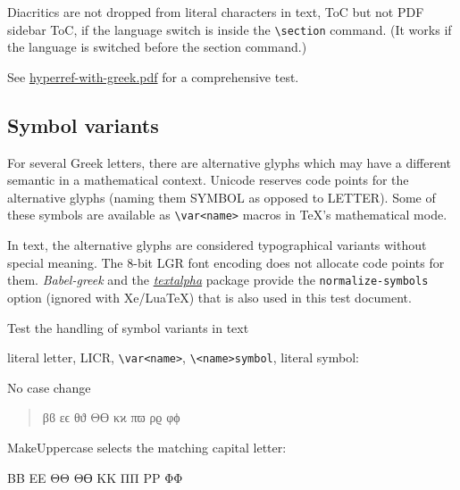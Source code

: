 \documentclass[a4paper]{article}
\newcommand*{\ux}[2]{\ignorespaces#1}
\newcommand*{\ux}[2]{\ignorespaces#2}
\newcommand*{\Greek}{\foreignlanguage{greek}}
\newcommand*{\Greek}{\ensuregreek}
\newcommand{\cs}[1]{\texttt{\textbackslash#1}}
\begin{document}
\ux{}{Transliteration input stays Latin in PDF strings.}

Diacritics are not dropped from literal characters in text, ToC but not
PDF sidebar ToC, if the language switch is inside the \cs{section} command.
(It works if the language is switched before the section command.)

See \href{hyperref-with-greek.pdf}{hyperref-with-greek.pdf} for a
comprehensive test.


\subsection{Symbol variants}

For several Greek letters, there are alternative glyphs which may
have a different semantic in a mathe­matical context.
Unicode reserves code points for the alternative glyphs
(naming them SYMBOL as opposed to LETTER).
Some of these symbols are available as \cs{var<name>} macros in TeX's
mathematical mode.

In text, the alternative glyphs are considered typographical variants
without special meaning. The 8-bit LGR font encoding does not allocate
code points for them. \emph{Babel-greek} and the \emph{%
\href{http://mirrors.ctan.org/language/greek/greek-fontenc/textalpha-doc.pdf}
{textalpha}} package provide the \texttt{normalize-symbols} option
(ignored with Xe/LuaTeX) that is also used in this test document.

\smallskip\noindent
Test the handling of symbol variants in text

literal letter, LICR, \cs{var<name>}, \cs{<name>symbol}, literal symbol:

\newcommand{\symbolvariants}{
  β\textbeta    \textvarbeta    \textbetasymbol    ϐ
  ε\textepsilon \textvarepsilon \textepsilonsymbol ϵ
  θ\texttheta   \textvartheta   \textthetasymbol   ϑ
  Θ\textTheta   \textvarTheta   \textThetasymbol   ϴ
  κ\textkappa   \textvarkappa   \textkappasymbol   ϰ
  π\textpi      \textvarpi      \textpisymbol      ϖ
  ρ\textrho     \textvarrho     \textrhosymbol     ϱ
  φ\textphi     \textvarphi     \textphisymbol     ϕ
}

\noindent
No case change
\begin{quote}
  \Greek{\symbolvariants}
\end{quote}
%
MakeUppercase selects the matching capital letter:

\begin{center}
  \Greek{\MakeUppercase{\symbolvariants}}
\end{center}
\end{document}
